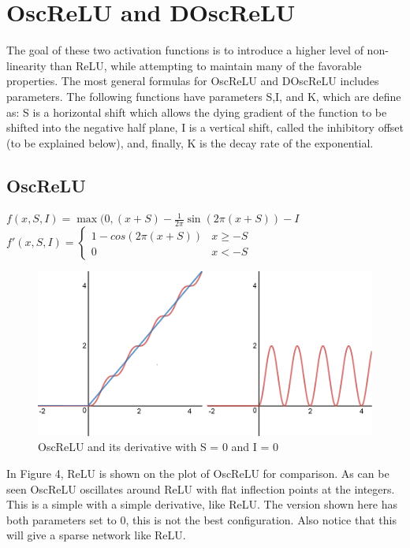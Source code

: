 \documentclass{amsart}
\theoremstyle{definition}
\theoremstyle{remark}
\numberwithin{equation}{section}
\newcommand{\blankbox}[2]{%
  \parbox{\columnwidth}{\centering
    \setlength{\fboxsep}{0pt}%
    \fbox{\raisebox{0pt}[#2]{\hspace{#1}}}%
  }%
}
\begin{document}
\hfill\break
\section{OscReLU and DOscReLU}  

The goal of these two activation functions is to introduce a higher level of non-linearity than ReLU, while attempting to maintain many of the favorable properties. The most general formulas for OscReLU and DOscReLU includes parameters. 
The following functions have parameters S,I, and K, which are define as:  S is a horizontal shift which allows the dying gradient of the function to be shifted into the negative half plane, I is a vertical shift, called the inhibitory offset (to be explained below), and, finally, K is the decay rate of the exponential.  
\newpage
\subsection{OscReLU}  \hfill \break 
\hfill\break
$f(x,S,I) = \max(0, (x + S) - \frac{1}{2\pi}\sin(2\pi (x+S)) - I$ \hfill \break
\hfill\break
$f'(x,S,I) = \begin{cases} 1 - cos(2\pi (x+S)) & x \geq -S \\ 0 & x < -S\end{cases}$ \hfill \break

\begin{figure}[!h]
\includegraphics[1]{OscReLU_with_ReLU_Derive.png}
\caption{OscReLU and its derivative with S = 0 and I = 0}
\label{Figure 4}
\end{figure}  

In Figure 4, ReLU is shown on the plot of OscReLU for comparison. As can be seen OscReLU oscillates around ReLU with flat inflection points at the integers. This is a simple with a simple derivative, like ReLU. The version shown here has both parameters set to 0, this is not the best configuration.  Also notice that this will give a sparse network like ReLU.   
\end{document}
